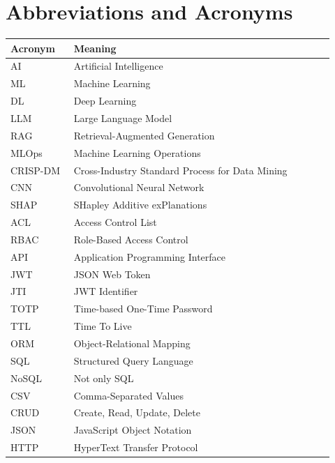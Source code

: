 \documentclass[12pt, a4paper, oneside]{report}
\begin{document}
\tableofcontents
\newpage

\listoffigures
\newpage

\listoftables
\newpage

\chapter*{Abbreviations and Acronyms}

\begin{longtable}{p{0.18\linewidth} L{0.74\linewidth}}
\textbf{Acronym} & \textbf{Meaning} \\
\hline
\endhead
AI        & Artificial Intelligence \\
ML        & Machine Learning \\
DL        & Deep Learning \\
LLM       & Large Language Model \\
RAG       & Retrieval-Augmented Generation \\
MLOps     & Machine Learning Operations \\
CRISP-DM  & Cross-Industry Standard Process for Data Mining \\
CNN       & Convolutional Neural Network \\
SHAP      & SHapley Additive exPlanations \\
ACL       & Access Control List \\
RBAC      & Role-Based Access Control \\
API       & Application Programming Interface \\
JWT       & JSON Web Token \\
JTI       & JWT Identifier \\
TOTP      & Time-based One-Time Password \\
TTL       & Time To Live \\
ORM       & Object-Relational Mapping \\
SQL       & Structured Query Language \\
NoSQL     & Not only SQL \\
CSV       & Comma-Separated Values \\
CRUD      & Create, Read, Update, Delete \\
JSON      & JavaScript Object Notation \\
HTTP      & HyperText Transfer Protocol \\

\end{longtable}
\end{document}
